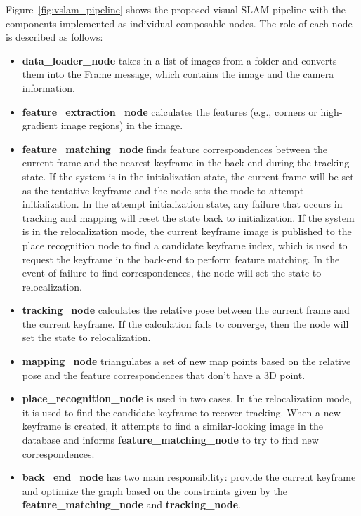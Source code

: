 Figure~\ref{fig:vslam_pipeline} shows the proposed visual SLAM pipeline with the components implemented as individual composable nodes. 
The role of each node is described as follows:
\begin{itemize}
  \item \textbf{data\_loader\_node} takes in a list of images from a folder and converts them into the Frame message, which contains the image and the camera information.
  
  \item \textbf{feature\_extraction\_node} calculates the features (e.g., corners or high-gradient image regions) in the image.
  
  \item \textbf{feature\_matching\_node} finds feature correspondences between the current frame and the nearest keyframe in the back-end during the tracking state.
  If the system is in the initialization state, the current frame will be set as the tentative keyframe and the node sets the mode to attempt initialization.
  In the attempt initialization state, any failure that occurs in tracking and mapping will reset the state back to initialization.
  If the system is in the relocalization mode, the current keyframe image is published to the place recognition node to find a candidate keyframe index, which is used to request the keyframe in the back-end to perform feature matching.
  In the event of failure to find correspondences, the node will set the state to relocalization.

  \item \textbf{tracking\_node} calculates the relative pose between the current frame and the current keyframe. 
  If the calculation fails to converge, then the node will set the state to relocalization. 

  \item \textbf{mapping\_node} triangulates a set of new map points based on the relative pose and the feature correspondences that don't have a 3D point. 

  \item \textbf{place\_recognition\_node} is used in two cases. 
  In the relocalization mode, it is used to find the candidate keyframe to recover tracking.
  When a new keyframe is created, it attempts to find a similar-looking image in the database and informs \textbf{feature\_matching\_node} to try to find new correspondences.

  \item \textbf{back\_end\_node} has two main responsibility: provide the current keyframe and optimize the graph based on the constraints given by the \textbf{feature\_matching\_node} and \textbf{tracking\_node}.
   
\end{itemize}

